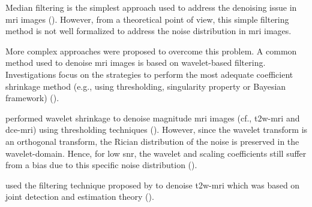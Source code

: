 \begin{enumerate}[leftmargin=*]
Median filtering is the simplest approach used to address the denoising issue in \ac{mri} images (\cite{Ozer2009,Ozer2010}). %
However, from a theoretical point of view, this simple filtering method is not well formalized to address the noise distribution in \ac{mri} images.

More complex approaches were proposed to overcome this problem. A common method used to denoise \ac{mri} images is based on wavelet-based filtering. %
Investigations focus on the strategies to perform the most adequate coefficient shrinkage method (e.g., using thresholding, singularity property or Bayesian framework) (\cite{Pizurica2002}).

\cite{Ampeliotis2007,Ampeliotis2008} performed wavelet shrinkage to denoise magnitude \ac{mri} images (cf., \ac{t2w}-\ac{mri} and \ac{dce}-\ac{mri}) using thresholding techniques (\cite{Mallat2008}). However, since the wavelet transform is an orthogonal transform, the Rician distribution of the noise is preserved in the wavelet-domain. Hence, for low \ac{snr}, the wavelet and scaling coefficients still suffer from a bias due to this specific noise distribution (\cite{Nowak1999}). 

\cite{Lopes2011} used the filtering technique proposed by \cite{Pizurica2003} to denoise \ac{t2w}-\ac{mri} which was based on joint detection and estimation theory (\cite{Middleton1968}).%


\end{enumerate}
